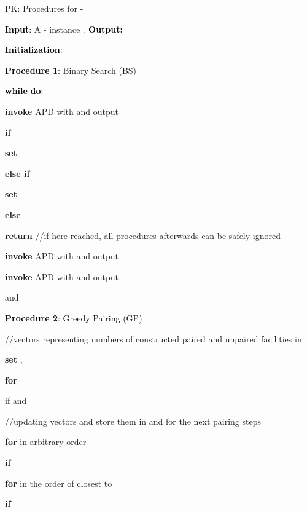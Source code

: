 \documentclass[10pt]{llncs}
\begin{document}
\begin{algorithm}
\caption{PK: Procedures for -}


\textbf{\textcolor{black}{Input}}\textcolor{black}{: }A -
instance \textcolor{black}{.}\textbf{\textcolor{black}{{}
Output: }}

\textbf{\textcolor{black}{Initialization}}\textcolor{black}{:} 

\textbf{\textcolor{black}{Procedure 1}}\textcolor{black}{: }Binary
Search (BS)



\textbf{\textcolor{black}{while}}\textcolor{black}{{} 
}\textbf{\textcolor{black}{do}}\textcolor{black}{:}

\qquad{}

\qquad{}\textbf{invoke} APD with 
and output 

\qquad{}

\qquad{}\textbf{if }

\qquad{}\qquad{}\textbf{set }

\qquad{}\textbf{else if }

\qquad{}\qquad{}\textbf{set }

\qquad{}\textbf{else}

\qquad{}\qquad{}\textbf{return  }//if here reached, all procedures
afterwards can be safely ignored

\textbf{invoke} APD with 
and output 

\textbf{invoke} APD with 
and output 

 and 

\medskip{}


\textbf{\textcolor{black}{Procedure 2}}\textcolor{black}{: Greedy
Pairing (GP)}

//vectors representing numbers of constructed paired and unpaired
facilities in 

\textbf{set} ,  

\textbf{for }

\qquad{}if  and 

\qquad{}\qquad{}

\qquad{}\qquad{}//updating vectors and store them in 
and  for the next pairing steps

\qquad{}\qquad{}

\qquad{}\qquad{}

\textbf{for  }in arbitrary order

\qquad{}\textbf{if} 

\qquad{}\qquad{}\textbf{for  }in
the order of closest to 

\qquad{}\qquad{}\qquad{}\textbf{if} 


\end{algorithm}
\end{document}

